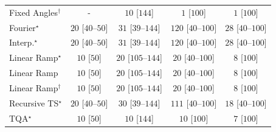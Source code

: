 \begin{tabular}{l|cccc|}
Fixed Angles$^\dagger$ & {\cellcolor[HTML]{000000}} \color[HTML]{F1F1F1} {\cellcolor{white}} \color{black} - & {\cellcolor[HTML]{F6FCF4}} \color[HTML]{000000} $10$ [$144$] & {\cellcolor[HTML]{F7FCF5}} \color[HTML]{000000} $1$ [$100$] & {\cellcolor[HTML]{F7FCF5}} \color[HTML]{000000} $1$ [$100$] \\
Fourier$^\star$ & {\cellcolor[HTML]{F4FBF1}} \color[HTML]{000000} $20$ [$40$--$50$] & {\cellcolor[HTML]{F2FAEF}} \color[HTML]{000000} $31$ [$39$--$144$] & {\cellcolor[HTML]{DEF2D9}} \color[HTML]{000000} $120$ [$40$--$100$] & {\cellcolor[HTML]{F2FAF0}} \color[HTML]{000000} $28$ [$40$--$100$] \\
Interp.$^\star$ & {\cellcolor[HTML]{F4FBF1}} \color[HTML]{000000} $20$ [$40$--$50$] & {\cellcolor[HTML]{F2FAEF}} \color[HTML]{000000} $31$ [$39$--$144$] & {\cellcolor[HTML]{DEF2D9}} \color[HTML]{000000} $120$ [$40$--$100$] & {\cellcolor[HTML]{F2FAF0}} \color[HTML]{000000} $28$ [$40$--$100$] \\
Linear Ramp$^\star$ & {\cellcolor[HTML]{F6FCF4}} \color[HTML]{000000} $10$ [$50$] & {\cellcolor[HTML]{F4FBF1}} \color[HTML]{000000} $20$ [$105$--$144$] & {\cellcolor[HTML]{F4FBF1}} \color[HTML]{000000} $20$ [$40$--$100$] & {\cellcolor[HTML]{F6FCF4}} \color[HTML]{000000} $8$ [$100$] \\
Linear Ramp & {\cellcolor[HTML]{F6FCF4}} \color[HTML]{000000} $10$ [$50$] & {\cellcolor[HTML]{F4FBF1}} \color[HTML]{000000} $20$ [$105$--$144$] & {\cellcolor[HTML]{F4FBF1}} \color[HTML]{000000} $20$ [$40$--$100$] & {\cellcolor[HTML]{F6FCF4}} \color[HTML]{000000} $8$ [$100$] \\
Linear Ramp$^\dagger$ & {\cellcolor[HTML]{F6FCF4}} \color[HTML]{000000} $10$ [$50$] & {\cellcolor[HTML]{F4FBF1}} \color[HTML]{000000} $20$ [$105$--$144$] & {\cellcolor[HTML]{F4FBF1}} \color[HTML]{000000} $20$ [$40$--$100$] & {\cellcolor[HTML]{F6FCF4}} \color[HTML]{000000} $8$ [$100$] \\
Recursive TS$^\star$ & {\cellcolor[HTML]{F4FBF1}} \color[HTML]{000000} $20$ [$40$--$50$] & {\cellcolor[HTML]{F2FAEF}} \color[HTML]{000000} $30$ [$39$--$144$] & {\cellcolor[HTML]{E1F3DC}} \color[HTML]{000000} $111$ [$40$--$100$] & {\cellcolor[HTML]{F4FBF2}} \color[HTML]{000000} $18$ [$40$--$100$] \\
TQA$^\star$ & {\cellcolor[HTML]{F6FCF4}} \color[HTML]{000000} $10$ [$50$] & {\cellcolor[HTML]{F6FCF4}} \color[HTML]{000000} $10$ [$144$] & {\cellcolor[HTML]{F6FCF4}} \color[HTML]{000000} $10$ [$100$] & {\cellcolor[HTML]{F6FCF4}} \color[HTML]{000000} $7$ [$100$] \\

\end{tabular}
